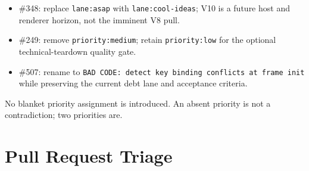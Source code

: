 \begin{itemize}
  \#219: replace \texttt{l\allowbreak{}a\allowbreak{}n\allowbreak{}e\allowbreak{}:\allowbreak{}i\allowbreak{}n\allowbreak{}b\allowbreak{}o\allowbreak{}x} with \texttt{l\allowbreak{}a\allowbreak{}n\allowbreak{}e\allowbreak{}:\allowbreak{}c\allowbreak{}o\allowbreak{}o\allowbreak{}l\allowbreak{}-\allowbreak{}i\allowbreak{}d\allowbreak{}e\allowbreak{}a\allowbreak{}s}.
\item
  \#348: replace \texttt{l\allowbreak{}a\allowbreak{}n\allowbreak{}e\allowbreak{}:\allowbreak{}a\allowbreak{}s\allowbreak{}a\allowbreak{}p} with \texttt{l\allowbreak{}a\allowbreak{}n\allowbreak{}e\allowbreak{}:\allowbreak{}c\allowbreak{}o\allowbreak{}o\allowbreak{}l\allowbreak{}-\allowbreak{}i\allowbreak{}d\allowbreak{}e\allowbreak{}a\allowbreak{}s}; V10 is a future host and renderer horizon, not the imminent V8 pull.
\item
  \#249: remove \texttt{p\allowbreak{}r\allowbreak{}i\allowbreak{}o\allowbreak{}r\allowbreak{}i\allowbreak{}t\allowbreak{}y\allowbreak{}:\allowbreak{}m\allowbreak{}e\allowbreak{}d\allowbreak{}i\allowbreak{}u\allowbreak{}m}; retain \texttt{p\allowbreak{}r\allowbreak{}i\allowbreak{}o\allowbreak{}r\allowbreak{}i\allowbreak{}t\allowbreak{}y\allowbreak{}:\allowbreak{}l\allowbreak{}o\allowbreak{}w} for the optional technical-teardown quality gate.
\item
  \#507: rename to \texttt{B\allowbreak{}A\allowbreak{}D\allowbreak{} \allowbreak{}C\allowbreak{}O\allowbreak{}D\allowbreak{}E\allowbreak{}:\allowbreak{} \allowbreak{}d\allowbreak{}e\allowbreak{}t\allowbreak{}e\allowbreak{}c\allowbreak{}t\allowbreak{} \allowbreak{}k\allowbreak{}e\allowbreak{}y\allowbreak{} \allowbreak{}b\allowbreak{}i\allowbreak{}n\allowbreak{}d\allowbreak{}i\allowbreak{}n\allowbreak{}g\allowbreak{} \allowbreak{}c\allowbreak{}o\allowbreak{}n\allowbreak{}f\allowbreak{}l\allowbreak{}i\allowbreak{}c\allowbreak{}t\allowbreak{}s\allowbreak{} \allowbreak{}a\allowbreak{}t\allowbreak{} \allowbreak{}f\allowbreak{}r\allowbreak{}a\allowbreak{}m\allowbreak{}e\allowbreak{} \allowbreak{}i\allowbreak{}n\allowbreak{}i\allowbreak{}t} while preserving the current debt lane and acceptance criteria.
\end{itemize}

No blanket priority assignment is introduced. An absent priority is not a contradiction; two priorities are.

\section{Pull Request Triage}\label{record-249-pull-request-triage}

